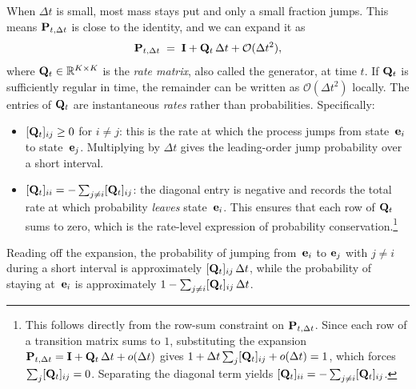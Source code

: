 When $\Delta t$ is small, most mass stays put and only a small fraction
jumps. This means ${\mathbf{P}}_{t,\Delta t}$ is close to the identity, and we
can expand it as
\begin{equation}
{\mathbf{P}}_{t,\Delta t}
\;=\; {\mathbf{I}} + {\mathbf{Q}}_t\,\Delta t + \mathcal{O}(\Delta t^2),
\label{eq:generator-expansion}
\end{equation}
where ${\mathbf{Q}}_t \in \mathbb{R}^{K \times K}$ is the \emph{rate matrix}, also
called the generator, at time $t$. If ${\mathbf{Q}}_t$ is sufficiently regular in time, the remainder can be written as $\mathcal{O}(\Delta t^2)$ locally. The entries of ${\mathbf{Q}}_t$ are instantaneous
\emph{rates} rather than probabilities. Specifically:
\begin{itemize}[leftmargin=2em]
    \item $[{\mathbf{Q}}_t]_{ij} \geq 0$ for $i \neq j$: this is the rate at which
      the process jumps from state~${\mathbf{e}}_i$ to state~${\mathbf{e}}_j$.
      Multiplying by $\Delta t$ gives the leading-order jump probability
      over a short interval.
    \item $[{\mathbf{Q}}_t]_{ii} = -\sum_{j \neq i} [{\mathbf{Q}}_t]_{ij}$: the
      diagonal entry is negative and records the total rate at which
      probability \emph{leaves} state~${\mathbf{e}}_i$. This ensures that each row
      of ${\mathbf{Q}}_t$ sums to zero, which is the rate-level expression of
      probability conservation.\footnote{This follows directly from the
      row-sum constraint on ${\mathbf{P}}_{t,\Delta t}$. Since each row of a
      transition matrix sums to $1$, substituting the expansion
      ${\mathbf{P}}_{t,\Delta t} = {\mathbf{I}} + {\mathbf{Q}}_t\,\Delta t
      + o(\Delta t)$ gives
      $1 + \Delta t \sum_{j} [{\mathbf{Q}}_t]_{ij}
      + o(\Delta t) = 1$,
      which forces $\sum_{j} [{\mathbf{Q}}_t]_{ij} = 0$. Separating the
      diagonal term yields
      $[{\mathbf{Q}}_t]_{ii} = -\sum_{j \neq i} [{\mathbf{Q}}_t]_{ij}$.}
\end{itemize}
Reading off the expansion, the probability of jumping from~${\mathbf{e}}_i$ to
${\mathbf{e}}_j$ with $j\neq i$ during a short interval is approximately
$[{\mathbf{Q}}_t]_{ij}\,\Delta t$, while the probability of staying
at~${\mathbf{e}}_i$ is approximately
$1 - \sum_{j \neq i} [{\mathbf{Q}}_t]_{ij}\,\Delta t$.

